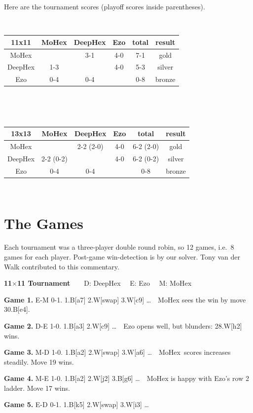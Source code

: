 \documentclass{icga}
\def\Dx{\mbox{\sc DeepHex}}
\def\Eo{\mbox{\sc Ezo}}
\def\Mx{\mbox{\sc MoHex}}
\begin{document}
Here are the tournament scores (playoff scores inside parentheses).

\ \hfill
\begin{tabular}{|c|c|c|c|c|c|}
\hline 11x11 &\Mx{} &\Dx{}    & \Eo{}     & total & result \\ 
\hline \Mx{} &      &  3-1    &  4-0      & 7-1  & gold \\
\hline \Dx{} &  1-3 &         &  4-0      & 5-3  &  silver\\
\hline \Eo{} &  0-4 &  0-4    &           & 0-8  &  bronze \\
\hline
\end{tabular}
\hfill \ 


\ \hfill
\begin{tabular}{|c|c|c|c|c|c|}
\hline 13x13 &\Mx{} &\Dx{}         & \Eo{}     & total & result \\ 
\hline \Mx{} &      &  2-2 (2-0)   &  4-0      & 6-2  (2-0) & gold \\
\hline \Dx{} &  2-2 (0-2) &         &  4-0      & 6-2 (0-2) &  silver\\
\hline \Eo{} &  0-4 &  0-4    &           & 0-8  &  bronze \\
\hline
\end{tabular}
\hfill \ 


\section{The Games}
Each tournament was a three-player double round robin, so 12 games,
i.e.\ 8 games for each player.
Post-game win-detection is by our solver.
Tony van der Walk contributed to this commentary.

{\large\bf 11$\times$11 Tournament} 
~ ~ {\sc D: \Dx\ ~ E: \Eo\ ~ M: \Mx}\nopagebreak[4]

{\bf Game 1.}
{\sc E-M 0-1.}
1.B[a7] 2.W[swap] 3.W[c9] \ldots \ \ 
\hfill\Mx{} sees the win by move 30.B[e4].

{\bf Game 2.}
{\sc D-E 1-0.}
1.B[a3] 2.W[c9] \ldots \ \ 
\hfill\Eo{} opens well, but blunders: 28.W[h2] wins.

{\bf Game 3.}
{\sc M-D 1-0.}
1.B[a2] 2.W[swap] 3.W[a6] \ldots \ \ 
\hfill\Mx{}ores increases steadily. Move 19 wins.

{\bf Game 4.}
{\sc M-E 1-0.}
1.B[a2] 2.W[j2] 3.B[g6] \ldots \ \ 
\hfill\Mx{} is happy with \Eo{}'s row 2 ladder. Move 17 wins.

{\bf Game 5.}
{\sc E-D 0-1.}
1.B[k5] 2.W[swap] 3.W[i3] \ldots \ \ 
\end{document}
